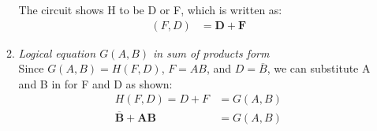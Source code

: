 \documentclass[12pt]{article}
\begin{document}
\begin{enumerate}
\begin{enumerate}
        The circuit shows H to be D or F, which is written as:
        \begin{align*}
        (F,D) &= \boxed{\mathbf{D + F}}
        \end{align*}
        \vspace{3mm}
        \item \textit{Logical equation $G(A,B)$ in sum of products form} \\

        Since $G(A,B) = H(F,D)$, $F = AB$, and $D = \overline{B}$, we can substitute A and B in for F and D as shown:
        \begin{align*}
        H(F,D) = D + F &= G(A,B) \\
        \boxed{\mathbf{\overline{B} + AB}} &= G(A,B)
        \end{align*}

	\end{enumerate}


\end{enumerate}
\end{document}
